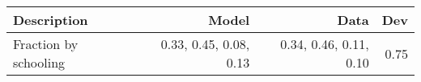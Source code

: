 \begin{tabular}{lrrr}
\hline
Description & Model  & Data  & Dev  \\ 
\hline
Fraction by schooling & 0.33, 0.45, 0.08, 0.13  & 0.34, 0.46, 0.11, 0.10  & 0.75  \\ 
\hline
\end{tabular}%
